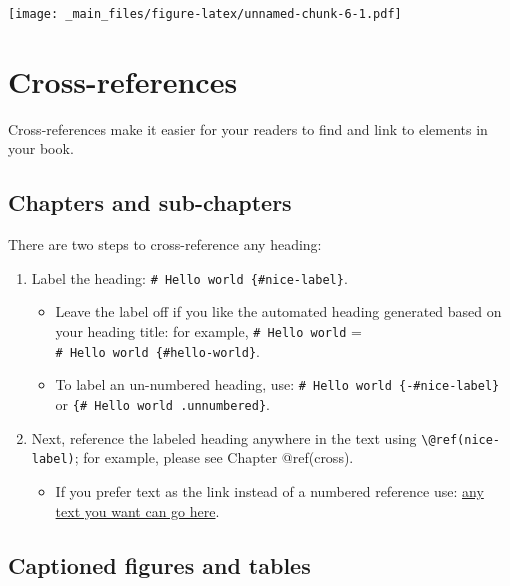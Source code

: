 \documentclass[
]{book}
\providecommand{\tightlist}{%
  \setlength{\itemsep}{0pt}\setlength{\parskip}{0pt}}
\begin{document}
\texttt{[image: \_main\_files/figure-latex/unnamed-chunk-6-1.pdf]}

\hypertarget{cross}{%
\chapter{Cross-references}\label{cross}}

Cross-references make it easier for your readers to find and link to
elements in your book.

\hypertarget{chapters-and-sub-chapters}{%
\section{Chapters and sub-chapters}\label{chapters-and-sub-chapters}}

There are two steps to cross-reference any heading:

\begin{enumerate}
\def\labelenumi{\arabic{enumi}.}
\tightlist
\item
  Label the heading: \texttt{\#\ Hello\ world\ \{\#nice-label\}}.

  \begin{itemize}
  \tightlist
  \item
    Leave the label off if you like the automated heading generated
    based on your heading title: for example, \texttt{\#\ Hello\ world}
    = \texttt{\#\ Hello\ world\ \{\#hello-world\}}.
  \item
    To label an un-numbered heading, use:
    \texttt{\#\ Hello\ world\ \{-\#nice-label\}} or
    \texttt{\{\#\ Hello\ world\ .unnumbered\}}.
  \end{itemize}
\item
  Next, reference the labeled heading anywhere in the text using
  \texttt{\textbackslash{}@ref(nice-label)}; for example, please see
  Chapter @ref(cross).

  \begin{itemize}
  \tightlist
  \item
    If you prefer text as the link instead of a numbered reference use:
    \protect\hyperlink{cross}{any text you want can go here}.
  \end{itemize}
\end{enumerate}

\hypertarget{captioned-figures-and-tables}{%
\section{Captioned figures and
tables}\label{captioned-figures-and-tables}}
\end{document}
